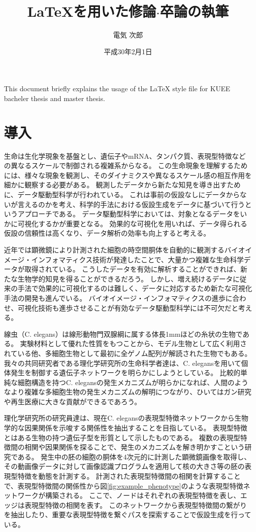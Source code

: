 \documentclass{kuee}
\title{\LaTeX を用いた修論$\cdot$卒論の執筆}
\author{電気 次郎}
\date{平成30年2月1日}
\begin{document}
\maketitle      %
\begin{eabstract}   %
This document briefly explains the usage of the \LaTeX{} style file
for KUEE bacheler thesis and master thesis.
\end{eabstract}
\tableofcontents    %

\chapter{導入}
\label{chap:intro}
生命は生化学現象を基盤とし、遺伝子やmRNA、タンパク質、表現型特徴などの異なるスケールで制御される複雑系からなる。
この生命現象を理解するためには、様々な現象を観測し、そのダイナミクスや異なるスケール感の相互作用を細かに観察する必要がある。
観測したデータから新たな知見を導き出すために、データ駆動型科学が行われている。
これは事前の仮設なしにデータからないが言えるのかを考え、科学的手法における仮設生成をデータに基づいて行うというアプローチである。
データ駆動型科学においては、対象となるデータをいかに可視化するかが重要となる。
効果的な可視化を用いれば、データ得られる仮設の信頼性は高くなり、データ解析の効率も向上すると考える。

近年では顕微鏡により計測された細胞の時空間胴体を自動的に観測するバイオイメージ・インフォマティクス技術が発達したことで、大量かつ複雑な生命科学データが取得されている。
こうしたデータを有効に解析することができれば、新たな生物学的知見を得ることができるだろう。
しかし、増え続けるデータに従来の手法で効果的に可視化するのは難しく、データに対応するため新たな可視化手法の開発も進んでいる。
バイオイメージ・インフォマティクスの進歩に合わせ、可視化技術も進歩させることが有効なデータ駆動型科学には不可欠だと考える。

線虫（C. elegans）は線形動物門双腺綱に属する体長1mmほどの糸状の生物である。
実験材料として優れた性質をもつことから、モデル生物として広く利用されている他、多細胞生物として最初に全ゲノム配列が解読された生物でもある。
我々の共同研究者である理化学研究所の生命科学者達は、C. elegansを用いて個体発生を制御する遺伝子ネットワークを明らかにしようとしている。
比較的単純な細胞構造を持つC. elegansの発生メカニズムが明らかになれば、人間のようなより複雑な多細胞生物の発生メカニズムの解明につながり、ひいてはガン研究や再生医療に大きな貢献ができるであろう。

理化学研究所の研究員達は、現在C. elegansの表現型特徴ネットワークから生物学的な因果関係を示唆する関係性を抽出することを目指している。
表現型特徴とはある生物の持つ遺伝子型を形質として示したものである。
複数の表現型特徴間の相関や因果関係を探ることで、発生のメカニズムを解き明かすこという研究である。
発生中の胚の細胞の胴体を4次元的に計測した顕微鏡画像を取得し、その動画像データに対して画像認識プログラムを適用して核の大きさ等の胚の表現型特徴を動態を計測する。
計測された表現型特徴間の相関を計算することで、表現型特徴間の関係性から図\ref{fig:example_phenotype}のような表現型特徴ネットワークが構築される。
ここで、ノードはそれぞれの表現型特徴を表し、エッジは表現型特徴の相関を表す。
このネットワークから表現型特徴間の繋がりを抽出したり、重要な表現型特徴を繋ぐパスを探索することで仮設生成を行っている。
\end{document}
